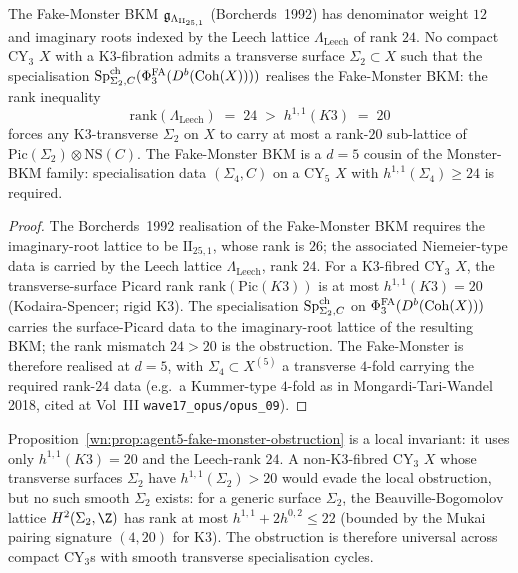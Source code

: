\begin{proposition}[Fake-Monster obstruction from $d = 3$ is a rank count]
\ClaimStatusTheorem\label{wn:prop:agent5-fake-monster-obstruction}
The Fake-Monster BKM $\mathfrak{g}_{\Lambda_{\mathrm{II}_{25,1}}}$
(Borcherds~1992) has denominator weight $12$ and imaginary roots
indexed by the Leech lattice $\Lambda_{\mathrm{Leech}}$ of rank $24$.
No compact CY$_3$ $X$ with a K3-fibration admits a transverse surface
$\Sigma_2 \subset X$ such that the specialisation
$\mathrm{Sp}^{\mathrm{ch}}_{\Sigma_2, C}(\Phi^{\mathrm{FA}}_3(D^b(\mathrm{Coh}(X))))$ realises the Fake-Monster
BKM: the rank inequality
\[
  \mathrm{rank}(\Lambda_{\mathrm{Leech}}) \;=\; 24 \;>\; h^{1,1}(K3) \;=\; 20
\]
forces any K3-transverse $\Sigma_2$ on $X$ to carry at most a rank-$20$
sub-lattice of $\mathrm{Pic}(\Sigma_2) \otimes \mathrm{NS}(C)$. The
Fake-Monster BKM is a $d = 5$ cousin of the Monster-BKM family:
specialisation data $(\Sigma_4, C)$ on a CY$_5$ $X$ with
$h^{1,1}(\Sigma_4) \ge 24$ is required.
\end{proposition}

\begin{proof}
The Borcherds~1992 realisation of the Fake-Monster BKM requires the
imaginary-root lattice to be $\mathrm{II}_{25,1}$, whose rank is $26$;
the associated Niemeier-type data is carried by the Leech lattice
$\Lambda_{\mathrm{Leech}}$, rank $24$. For a K3-fibred CY$_3$ $X$, the
transverse-surface Picard rank $\mathrm{rank}(\mathrm{Pic}(K3))$ is at
most $h^{1,1}(K3) = 20$ (Kodaira-Spencer; rigid K3). The
specialisation $\mathrm{Sp}^{\mathrm{ch}}_{\Sigma_2, C}$ on $\Phi^{\mathrm{FA}}_3(D^b(\mathrm{Coh}(X)))$
carries the surface-Picard data to the imaginary-root lattice of the
resulting BKM; the rank mismatch $24 > 20$ is the obstruction. The
Fake-Monster is therefore realised at $d = 5$, with
$\Sigma_4 \subset X^{(5)}$ a transverse $4$-fold carrying the required
rank-$24$ data (e.g.\ a Kummer-type $4$-fold as in Mongardi-Tari-Wandel
2018, cited at Vol~III \texttt{wave17\_opus/opus\_09}).
\end{proof}

\begin{remark}
\label{wn:rem:agent5-local-vs-global}
Proposition~\ref{wn:prop:agent5-fake-monster-obstruction} is a local
invariant: it uses only $h^{1,1}(K3) = 20$ and the Leech-rank $24$. A
non-K3-fibred CY$_3$ $X$ whose transverse surfaces $\Sigma_2$ have
$h^{1,1}(\Sigma_2) > 20$ would evade the local obstruction, but no such
smooth $\Sigma_2$ exists: for a generic surface $\Sigma_2$, the
Beauville-Bogomolov lattice $H^2(\Sigma_2, \Z)$ has rank at most
$h^{1,1} + 2h^{0,2} \le 22$ (bounded by the Mukai pairing signature
$(4, 20)$ for K3). The obstruction is therefore universal across
compact CY$_3$s with smooth transverse specialisation cycles.
\end{remark}

